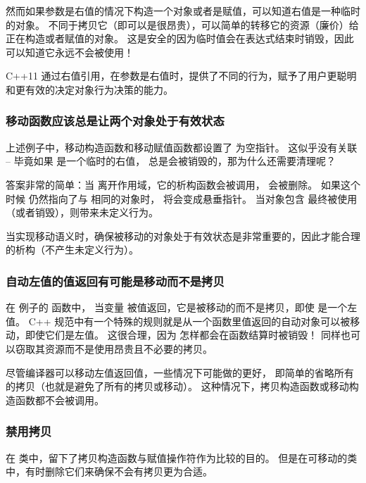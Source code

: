 \documentclass[../../LearnCpp.tex]{subfiles}
\begin{document}
然而如果参数是右值的情况下构造一个对象或者是赋值，可以知道右值是一种临时的对象。
不同于拷贝它（即可以是很昂贵），可以简单的转移它的资源（廉价）给正在构造或者赋值的对象。
这是安全的因为临时值会在表达式结束时销毁，因此可以知道它永远不会被使用！

C++11 通过右值引用，在参数是右值时，提供了不同的行为，赋予了用户更聪明和更有效的决定对象行为决策的能力。

\subsubsection*{移动函数应该总是让两个对象处于有效状态}

上述例子中，移动构造函数和移动赋值函数都设置了  为空指针。
这似乎没有关联 -- 毕竟如果  是一个临时的右值， 总是会被销毁的，那为什么还需要清理呢？

答案非常的简单：当  离开作用域，它的析构函数会被调用， 会被删除。
如果这个时候  仍然指向了与  相同的对象时， 将会变成悬垂指针。
当对象包含  最终被使用（或者销毁），则带来未定义行为。

当实现移动语义时，确保被移动的对象处于有效状态是非常重要的，因此才能合理的析构（不产生未定义行为）。

\subsubsection*{自动左值的值返回有可能是移动而不是拷贝}

在  例子的  函数中，
当变量  被值返回，它是被移动的而不是拷贝，即使  是一个左值。
C++ 规范中有一个特殊的规则就是从一个函数里值返回的自动对象可以被移动，即使它们是左值。
这很合理，因为  怎样都会在函数结算时被销毁！
同样也可以窃取其资源而不是使用昂贵且不必要的拷贝。

尽管编译器可以移动左值返回值，一些情况下可能做的更好，
即简单的省略所有的拷贝（也就是避免了所有的拷贝或移动）。
这种情况下，拷贝构造函数或移动构造函数都不会被调用。

\subsubsection*{禁用拷贝}

在  类中，留下了拷贝构造函数与赋值操作符作为比较的目的。
但是在可移动的类中，有时删除它们来确保不会有拷贝更为合适。
\end{document}
